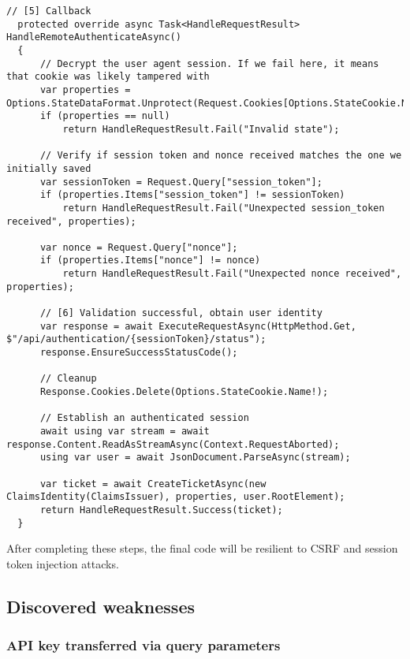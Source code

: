 \begin{lstlisting}[caption={Handling access token creation}, label={lst:dokobit-handleremote}]
  // [5] Callback
  protected override async Task<HandleRequestResult> HandleRemoteAuthenticateAsync()
  {
      // Decrypt the user agent session. If we fail here, it means that cookie was likely tampered with
      var properties = Options.StateDataFormat.Unprotect(Request.Cookies[Options.StateCookie.Name!]);
      if (properties == null)
          return HandleRequestResult.Fail("Invalid state");
  
      // Verify if session token and nonce received matches the one we initially saved
      var sessionToken = Request.Query["session_token"];
      if (properties.Items["session_token"] != sessionToken)
          return HandleRequestResult.Fail("Unexpected session_token received", properties);

      var nonce = Request.Query["nonce"];
      if (properties.Items["nonce"] != nonce)
          return HandleRequestResult.Fail("Unexpected nonce received", properties);
  
      // [6] Validation successful, obtain user identity
      var response = await ExecuteRequestAsync(HttpMethod.Get, $"/api/authentication/{sessionToken}/status");
      response.EnsureSuccessStatusCode();
  
      // Cleanup
      Response.Cookies.Delete(Options.StateCookie.Name!);
  
      // Establish an authenticated session
      await using var stream = await response.Content.ReadAsStreamAsync(Context.RequestAborted);
      using var user = await JsonDocument.ParseAsync(stream);
  
      var ticket = await CreateTicketAsync(new ClaimsIdentity(ClaimsIssuer), properties, user.RootElement);
      return HandleRequestResult.Success(ticket);
  }
\end{lstlisting}

After completing these steps, the final code will be resilient to CSRF and session token injection attacks.

\subsection{Discovered weaknesses}

\subsubsection{API key transferred via query parameters}

